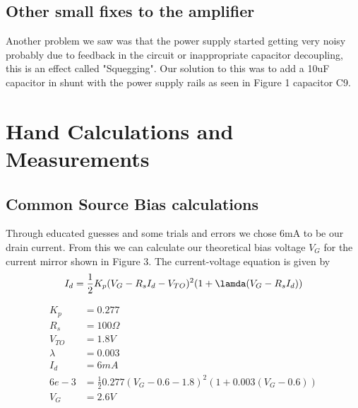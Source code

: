 \documentclass[11pt, twoside, letterpaper]{article}
\begin{document}
\subsection{Other small fixes to the amplifier}
Another problem we saw was that the power supply started getting very noisy probably due to feedback in the circuit or inappropriate capacitor
decoupling, this is an effect called "Squegging". Our solution to this was to add a 10uF capacitor in shunt with the power supply rails as 
seen in Figure 1 capacitor C9.

\section{Hand Calculations and Measurements}
\subsection{Common Source Bias calculations}
Through educated guesses and some trials and errors we chose 6mA to be our drain current. From this we can calculate our theoretical bias voltage
$V_G$ for the current mirror shown in Figure 3. The current-voltage equation is given by
\begin{equation}
I_d = \frac{1}{2}K_p(V_G-R_sI_d-V_{TO})^2(1+\lamda(V_G-R_sI_d))
\end{equation}

\begin{align*}
K_p &= 0.277\\
R_s &= 100\Omega\\
V_{TO} &= 1.8V\\
\lambda &= 0.003\\
I_d &= 6mA\\
6e-3 &= \frac{1}{2}0.277(V_G-0.6-1.8)^2(1+0.003(V_G-0.6))\\
V_G &= 2.6V
\end{align*}
\end{document}
